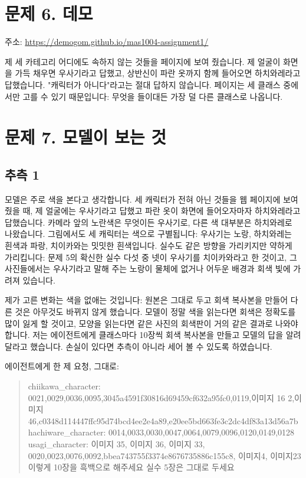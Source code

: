 \documentclass[11pt]{article}
\begin{document}
\section*{문제 6. 데모}

주소: \url{https://demogom.github.io/mas1004-assignment1/}

제 세 카테고리 어디에도 속하지 않는 것들을 페이지에 보여 줬습니다. 제 얼굴이
화면을 가득 채우면 우사기라고 답했고, 상반신이 파란 옷까지 함께 들어오면
하치와레라고 답했습니다. "캐릭터가 아니다"라고는 절대 답하지 않습니다.
페이지는 세 클래스 중에서만 고를 수 있기 때문입니다: 무엇을 들이대든 가장 덜
다른 클래스로 나옵니다.

\section*{문제 7. 모델이 보는 것}

\subsection*{추측 1}

모델은 주로 색을 본다고 생각합니다. 세 캐릭터가 전혀 아닌 것들을 웹 페이지에
보여 줬을 때, 제 얼굴에는 우사기라고 답했고 파란 옷이 화면에 들어오자마자
하치와레라고 답했습니다. 카메라 앞의 노란색은 무엇이든 우사기로, 다른 색
대부분은 하치와레로 나왔습니다. 그림에서도 세 캐릭터는 색으로 구별됩니다:
우사기는 노랑, 하치와레는 흰색과 파랑, 치이카와는 밋밋한 흰색입니다. 실수도
같은 방향을 가리키지만 약하게 가리킵니다: 문제 5의 확신한 실수 다섯 중 넷이
우사기를 치이카와라고 한 것이고, 그 사진들에서는 우사기라고 말해 주는 노랑이
물체에 없거나 어두운 배경과 회색 빛에 가려져 있습니다.

제가 고른 변화는 색을 없애는 것입니다: 원본은 그대로 두고 회색 복사본을
만들어 다른 것은 아무것도 바뀌지 않게 했습니다. 모델이 정말 색을 읽는다면
회색은 정확도를 많이 잃게 할 것이고, 모양을 읽는다면 같은 사진의 회색판이
거의 같은 결과로 나와야 합니다. 저는 에이전트에게 클래스마다 10장씩 회색
복사본을 만들고 모델의 답을 알려 달라고 했습니다. 손실이 있다면 추측이 아니라
세어 볼 수 있도록 하였습니다.

에이전트에게 한 제 요청, 그대로:
\begin{quote}\small
chiikawa\_character: 0021,0029,0036,0095,3045a4591f30816d69459cf632a95fc0,0119,이미지 16 2,이미지 46,c0348d114447ffc95d74bcd4ee2e4a89,e20ee5bd663fe3c2dc4df83a13d56a7b\\
hachiware\_character: 0014,0033,0030,0047,0064,0079,0096,0120,0149,0128\\
usagi\_character: 이미지 35, 이미지 36, 이미지 33, 0020,0023,0076,0092,bbea743755f3374e8676735886c155c8, 이미지4, 이미지23\\[0.4em]
이렇게 10장을 흑백으로 해주세요 실수 5장은 그대로 두세요
\end{quote}
\end{document}
